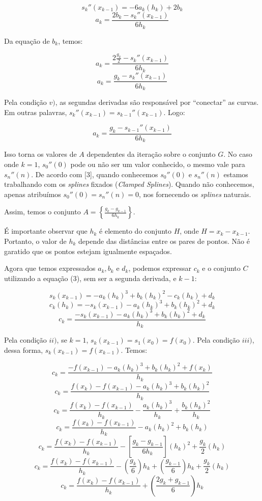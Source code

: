\documentclass[11pt]{article}
\begin{document}
$$s_{k}''(x_{k-1}) = -6a_k(h_k) + 2b_k$$
$$a_k = \frac{2b_k - s_{k}''(x_{k-1})}{6h_k}$$

Da equação de $b_k$, temos:

$$a_k = \frac{2\frac{g_k}{2} - s_{k}''(x_{k-1})}{6h_k}$$
$$a_k = \frac{g_k - s_{k}''(x_{k-1})}{6h_k}$$

Pela condição $v)$, as segundas derivadas são responsável por
``conectar'' as curvas. Em outras palavras, $s_k''(x_{k-1}) = s_{k-1}''(x_{k-1})$.
Logo:

$$a_k = \frac{g_k - s_{k-1}''(x_{k-1})}{6h_k}$$ 

Isso torna os valores de $A$ dependentes da iteração sobre o conjunto
$G$. No caso onde $k = 1$, $s_0''(0)$ pode ou não ser um valor conhecido,
o mesmo vale para $s_n''(n)$. De acordo com [3], quando conhecemos $s_0''(0)$
e $s_n''(n)$ estamos trabalhando com os \textit{splines} fixados
(\textit{Clamped Splines}). Quando não conhecemos, apenas atribuímos
$s_0''(0) = s_n''(n) = 0$, nos fornecendo os \textit{splines} naturais.

Assim, temos o conjunto $A = \left\lbrace\frac{g_k - g_{k-1}}{6h_k}\right\rbrace$.

É importante observar que $h_k$ é elemento do conjunto $H$,
onde $H = {x_k - x_{k-1}}$. Portanto, o valor de $h_k$ depende
das distâncias entre os pares de pontos. Não é garatido que os
pontos estejam igualmente espaçados.

Agora que temos expressados $a_k, b_k$ e $d_k$, podemos expressar $c_k$
e o conjunto $C$ utilizando a equação (3), sem ser a segunda
derivada, e $k-1$:

$$s_k(x_{k-1}) = -a_k(h_k)^3 + b_k(h_k)^2 - c_k(h_k) + d_k$$
$$c_k(h_k) = -s_k(x_{k-1}) - a_k(h_k)^3 + b_k(h_k)^2 + d_k$$
$$c_k = \frac{-s_k(x_{k-1}) - a_k(h_k)^3 + b_k(h_k)^2 + d_k}{h_k}$$

Pela condição $ii)$, se $k = 1$, $s_k(x_{k-1}) = s_1(x_0) = f(x_0)$.
Pela condição $iii)$, dessa forma, $s_k(x_{k-1}) = f(x_{k-1})$. Temos:

$$c_k = \frac{-f(x_{k-1}) - a_k(h_k)^3 + b_k(h_k)^2 + f(x_k)}{h_k}$$
$$c_k = \frac{f(x_k) - f(x_{k-1}) - a_k(h_k)^3 + b_k(h_k)^2}{h_k}$$
$$c_k = \frac{f(x_k) - f(x_{k-1})}{h_k} - \frac{a_k(h_k)^3}{h_k} + \frac{b_k(h_k)^2}{h_k}$$
$$c_k = \frac{f(x_k) - f(x_{k-1})}{h_k} - a_k(h_k)^2 + b_k(h_k)$$
$$c_k = \frac{f(x_k) - f(x_{k-1})}{h_k} - \left[ \frac{g_k - g_{k-1}}{6h_k} \right](h_k)^2 + \frac{g_k}{2}(h_k)$$
$$c_k = \frac{f(x_k) - f(x_{k-1})}{h_k} - \left( \frac{g_k}{6} \right)h_k + \left( \frac{g_{k-1}}{6}\right)h_k + \frac{g_k}{2}(h_k)$$
$$c_k = \frac{f(x_k) - f(x_{k-1})}{h_k} + \left( \frac{2g_k + g_{k-1}}{6}\right)h_k$$
\end{document}
